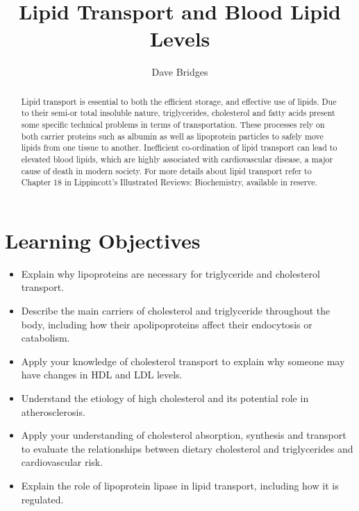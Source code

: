 \documentclass{tufte-handout}
\title{Lipid Transport and Blood Lipid Levels}
\author{Dave Bridges}
\date{}  %
\begin{document}
\maketitle%

\begin{abstract}
\noindent  Lipid transport is essential to both the efficient storage, and effective use of lipids.  Due to their semi-or total insoluble nature, triglycerides, cholesterol and fatty acids present some specific technical problems in terms of transportation.  These processes rely on both carrier proteins such as albumin as well as lipoprotein particles to safely move lipids from one tissue to another.  Inefficient co-ordination of lipid transport can lead to elevated blood lipids, which are highly associated with cardiovascular disease, a major cause of death in modern society.  For more details about lipid transport refer to Chapter 18 in Lippincott's Illustrated Reviews: Biochemistry, available in reserve\cite{Ferrier2017}.
\end{abstract}

\tableofcontents

\pagebreak
\section{Learning Objectives}

\begin{itemize}
\item Explain why lipoproteins are necessary for triglyceride and cholesterol transport.
\item Describe the main carriers of cholesterol and triglyceride throughout the body, including how their apolipoproteins affect their endocytosis or catabolism.
\item Apply your knowledge of cholesterol transport to explain why someone may have changes in HDL and LDL levels.
\item Understand the etiology of high cholesterol and its potential role in atherosclerosis.  
\item Apply your understanding of cholesterol absorption, synthesis and transport to evaluate the relationships between dietary cholesterol and triglycerides and cardiovascular risk.
\item Explain the role of lipoprotein lipase in lipid transport, including how it is regulated.

\end{itemize}
\end{document}
